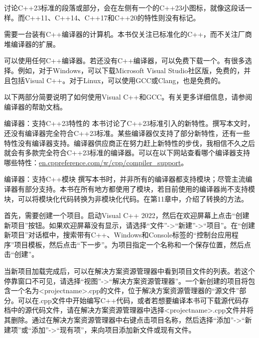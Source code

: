 

讨论C++23标准的段落或部分，会在左侧有一个的C++23小图标，就像这段话一样。而C++11、C++14、C++17和C++20的特性则没有标记。


需要一台装有C++编译器的计算机。本书仅关注已标准化的C++，而不关注厂商堆编译器的扩展。


可以使用任何C++编译器。若还没有C++编译器，可以免费下载一个。有很多选择。例如，对于Windows，可以下载Microsoft Visual Studio社区版，免费的，并且包括Visual C++。对于Linux，可以使用GCC或Clang，也是免费的。

以下两部分简要说明了如何使用Visual C++和GCC。有关更多详细信息，请参阅编译器的帮助文档。

\begin{myTip}{编译器：支持C++23特性的}
本书讨论了C++23标准引入的新特性。撰写本文时，还没有编译器完全符合C++23标准。某些编译器仅支持了部分新特性，还有一些特性没有编译器支持。编译器供应商正在努力赶上新特性的步伐，我相信不久之后就会有多款完全符合C++23标准的编译器。可以在以下网站查看哪个编译器支持哪些特性：\href{http://en.cppreference.com/w/cpp/compiler_support}{en.cppreference.com/w/cpp/compiler\_support}。
\end{myTip}

\begin{myTip}{编译器：支持C++模块}
撰写本书时，并非所有的编译器都支持模块；尽管主流编译器有部分支持。本书在所有地方都使用了模块，若目前使用的编译器尚不支持模块，可以将模块化代码转换为非模块化代码。在第11章中，介绍了转换的方法。
\end{myTip}


首先，需要创建一个项目。启动Visual C++ 2022，然后在欢迎屏幕上点击“创建新项目”按钮。如果欢迎屏幕没有显示，请选择“文件”->“新建”->“项目”。在“创建新项目”对话框中，搜索带有C++、Windows和Console标签的“控制台应用程序”项目模板，然后点击“下一步”。为项目指定一个名称和一个保存位置，然后点击“创建”。

当新项目加载完成后，可以在解决方案资源管理器中看到项目文件的列表。若这个停靠窗口不可见，请选择“视图”->“解决方案资源管理器”。一个新创建的项目将包含一个名为<projectname>.cpp的文件，位于解决方案资源管理器的“源文件”部分。可以在.cpp文件中开始编写C++代码，或者若想要编译本书可下载源代码存档中的源代码文件，请在解决方案资源管理器中选择<projectname>.cpp文件并将其删除。通过在解决方案资源管理器中右键点击项目名称，然后选择“添加”->“新建项”或“添加”->“现有项”，来向项目添加新文件或现有文件。

